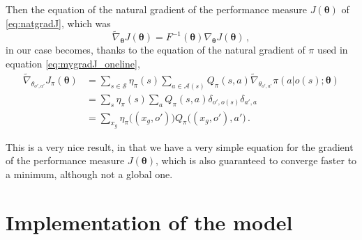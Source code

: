 Then the equation of the natural gradient of the performance measure $J(\boldsymbol \theta)$ of \eqref{eq:natgradJ}, which was
\begin{equation*}
    \widetilde \nabla_{\boldsymbol \theta} J(\boldsymbol \theta) = F^{-1}(\boldsymbol \theta) \nabla_{\boldsymbol \theta} J(\boldsymbol \theta) \, ,
\end{equation*}
in our case becomes, thanks to the equation of the natural gradient of $\pi$ used in equation \eqref{eq:mygradJ_oneline},
\begin{equation}
    \begin{aligned}
        \widetilde \nabla_{\theta_{o',a'}} J_\pi (\boldsymbol \theta)
        &= \sum_{s \in \mathcal S} \eta_\pi(s) \sum_{a \in \mathcal A(s)} Q_\pi(s,a) \widetilde \nabla_{\theta_{o',a'}} \pi(a|o(s); \boldsymbol \theta) \\
        &= \sum_s \eta_\pi(s) \sum_a Q_\pi(s,a) \delta_{o', o(s)} \delta_{a',a} \\
        &= \sum_{x_g} \eta_\pi \big((x_g, o') \big) Q_\pi \big((x_g, o'), a' \big)\, .
    \end{aligned}
    \label{eq:mynatgradJ}
\end{equation}

This is a very nice result, in that we have a very simple equation for the gradient of the performance measure $J(\boldsymbol \theta)$, which is also guaranteed to converge faster to a minimum, although not a global one.


\section{Implementation of the model}
\label{sec:model-implementation}

